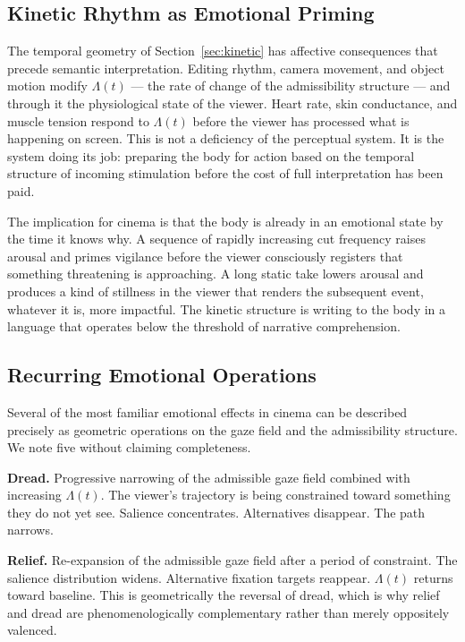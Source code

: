 \documentclass[12pt, a4paper]{article}
\theoremstyle{plain}
\theoremstyle{definition}
\theoremstyle{remark}
\begin{document}
\subsection{Kinetic Rhythm as Emotional Priming}
\label{subsec:priming}

The temporal geometry of Section~\ref{sec:kinetic} has
affective consequences that precede semantic interpretation.
Editing rhythm, camera movement, and object motion modify
$\Lambda(t)$ --- the rate of change of the admissibility
structure --- and through it the physiological state of the
viewer. Heart rate, skin conductance, and muscle tension
respond to $\Lambda(t)$ before the viewer has processed
what is happening on screen. This is not a deficiency of
the perceptual system. It is the system doing its job:
preparing the body for action based on the temporal
structure of incoming stimulation before the cost of full
interpretation has been paid.

The implication for cinema is that the body is already in
an emotional state by the time it knows why. A sequence of
rapidly increasing cut frequency raises arousal and primes
vigilance before the viewer consciously registers that
something threatening is approaching. A long static take
lowers arousal and produces a kind of stillness in the
viewer that renders the subsequent event, whatever it is,
more impactful. The kinetic structure is writing to the
body in a language that operates below the threshold of
narrative comprehension.

\subsection{Recurring Emotional Operations}
\label{subsec:emotions}

Several of the most familiar emotional effects in cinema
can be described precisely as geometric operations on the
gaze field and the admissibility structure. We note five
without claiming completeness.

\medskip
\noindent\textbf{Dread.} Progressive narrowing of the
admissible gaze field combined with increasing $\Lambda(t)$.
The viewer's trajectory is being constrained toward
something they do not yet see. Salience concentrates.
Alternatives disappear. The path narrows.

\medskip
\noindent\textbf{Relief.} Re-expansion of the admissible
gaze field after a period of constraint. The salience
distribution widens. Alternative fixation targets reappear.
$\Lambda(t)$ returns toward baseline. This is geometrically
the reversal of dread, which is why relief and dread are
phenomenologically complementary rather than merely
oppositely valenced.
\end{document}
